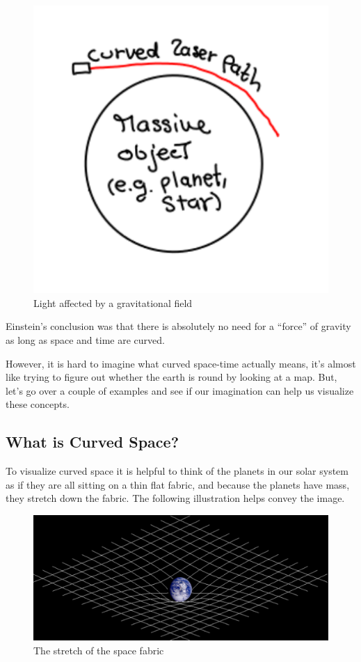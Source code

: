 \documentclass[12pt, letterpaper]{article}
\begin{document}
     \begin{figure}[h!]
        \caption{Light affected by a gravitational field}
        \centering
        \includegraphics[scale=0.5]{planet_curves_light.pdf}
    \end{figure}    
    
    Einstein's conclusion was that there is absolutely no need 
    for a ``force'' of gravity as long as space and time are curved.
    
    However, it is hard to imagine what curved space-time actually means, 
    it's almost like trying to figure out whether the earth is round by 
    looking at a map. But, let's go over a couple of examples and see if 
    our imagination can help us visualize these concepts. 
    
    \subsection*{What is Curved Space?}
    To visualize curved space it is helpful to think of the planets in our 
    solar system as if they are all sitting on a thin flat fabric, and 
    because the planets have mass, they stretch down the fabric. The 
    following illustration helps convey the image.
    
     \begin{figure}[h!]
        \caption{The stretch of the space fabric}
        \centering
        \includegraphics[scale=0.5]{space_time_curvature.pdf}
    \end{figure}      
    
\end{document}

